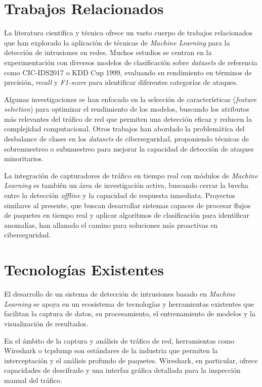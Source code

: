\section{Trabajos Relacionados}

La literatura científica y técnica ofrece un vasto cuerpo de trabajos relacionados que han explorado la aplicación de técnicas de \textit{Machine Learning} para la detección de intrusiones en redes. Muchos estudios se centran en la experimentación con diversos modelos de clasificación sobre \textit{datasets} de referencia como CIC-IDS2017 o KDD Cup 1999, evaluando su rendimiento en términos de precisión, \textit{recall} y \textit{F1-score} para identificar diferentes categorías de ataques.

Algunas investigaciones se han enfocado en la selección de características (\textit{feature selection}) para optimizar el rendimiento de los modelos, buscando los atributos más relevantes del tráfico de red que permiten una detección eficaz y reducen la complejidad computacional. Otros trabajos han abordado la problemática del desbalance de clases en los \textit{datasets} de ciberseguridad, proponiendo técnicas de sobremuestreo o submuestreo para mejorar la capacidad de detección de ataques minoritarios.

La integración de capturadores de tráfico en tiempo real con módulos de \textit{Machine Learning} es también un área de investigación activa, buscando cerrar la brecha entre la detección \textit{offline} y la capacidad de respuesta inmediata. Proyectos similares al presente, que buscan desarrollar sistemas capaces de procesar flujos de paquetes en tiempo real y aplicar algoritmos de clasificación para identificar anomalías, han allanado el camino para soluciones más proactivas en ciberseguridad.

\section{Tecnologías Existentes}

El desarrollo de un sistema de detección de intrusiones basado en \textit{Machine Learning} se apoya en un ecosistema de tecnologías y herramientas existentes que facilitan la captura de datos, su procesamiento, el entrenamiento de modelos y la visualización de resultados.

En el ámbito de la captura y análisis de tráfico de red, herramientas como Wireshark o tcpdump son estándares de la industria que permiten la interceptación y el análisis profundo de paquetes. Wireshark, en particular, ofrece capacidades de descifrado y una interfaz gráfica detallada para la inspección manual del tráfico.

